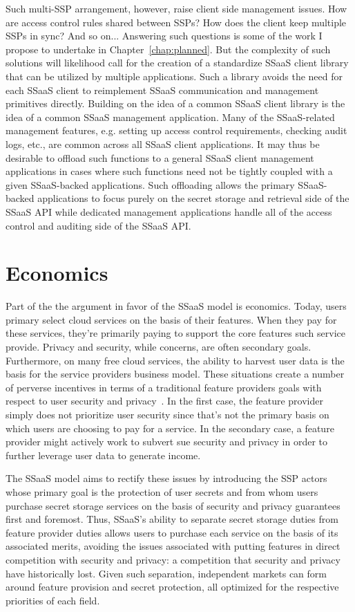 Such multi-SSP arrangement, however, raise client side management
issues. How are access control rules shared between SSPs? How does the
client keep multiple SSPs in sync? And so on... Answering such
questions is some of the work I propose to undertake in
Chapter~\ref{chap:planned}. But the complexity of such solutions will
likelihood call for the creation of a standardize SSaaS client library
that can be utilized by multiple applications. Such a library avoids
the need for each SSaaS client to reimplement SSaaS communication and
management primitives directly. Building on the idea of a common SSaaS
client library is the idea of a common SSaaS management
application. Many of the SSaaS-related management features,
e.g. setting up access control requirements, checking audit logs,
etc., are common across all SSaaS client applications. It may thus be
desirable to offload such functions to a general SSaaS client
management applications in cases where such functions need not be
tightly coupled with a given SSaaS-backed applications. Such
offloading allows the primary SSaaS-backed applications to focus
purely on the secret storage and retrieval side of the SSaaS API while
dedicated management applications handle all of the access control and
auditing side of the SSaaS API.

\section{Economics}
\label{chap:ssaas:economics}

Part of the the argument in favor of the SSaaS model is
economics. Today, users primary select cloud services on the basis of
their features. When they pay for these services, they're primarily
paying to support the core features such service provide. Privacy and
security, while concerns, are often secondary goals. Furthermore, on
many free cloud services, the ability to harvest user data is the
basis for the service providers business model. These situations
create a number of perverse incentives in terms of a traditional
feature providers goals with respect to user security and
privacy~\cite{anderson2001}. In the first case, the feature provider
simply does not prioritize user security since that's not the primary
basis on which users are choosing to pay for a service. In the
secondary case, a feature provider might actively work to subvert sue
security and privacy in order to further leverage user data to
generate income.

The SSaaS model aims to rectify these issues by introducing the SSP
actors whose primary goal is the protection of user secrets and from
whom users purchase secret storage services on the basis of security
and privacy guarantees first and foremost. Thus, SSaaS's ability to
separate secret storage duties from feature provider duties allows
users to purchase each service on the basis of its associated merits,
avoiding the issues associated with putting features in direct
competition with security and privacy: a competition that security and
privacy have historically lost. Given such separation, independent
markets can form around feature provision and secret protection, all
optimized for the respective priorities of each field.

